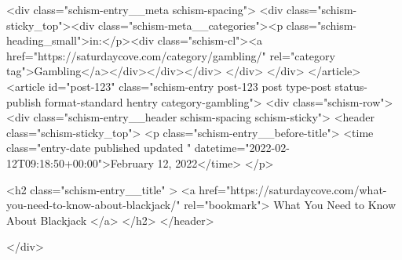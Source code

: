 {		<div class="schism-entry__meta schism-spacing">			<div class="schism-sticky_top"><div class="schism-meta__categories"><p class="schism-heading_small">in:</p><div class="schism-cl"><a href="https://saturdaycove.com/category/gambling/" rel="category tag">Gambling</a></div></div></div>		</div>
	</div>
</article>
<article id="post-123" class="schism-entry post-123 post type-post status-publish format-standard hentry category-gambling">
	<div class="schism-row">		<div class="schism-entry__header schism-spacing schism-sticky">			<header class="schism-sticky_top">				<p class="schism-entry__before-title">
					<time class="entry-date published updated " datetime="2022-02-12T09:18:50+00:00">February 12, 2022</time>				</p>

				<h2 class="schism-entry__title" >
					<a href="https://saturdaycove.com/what-you-need-to-know-about-blackjack/" rel="bookmark">
						What You Need to Know About Blackjack					</a>
				</h2>
			</header>

					</div>

}
